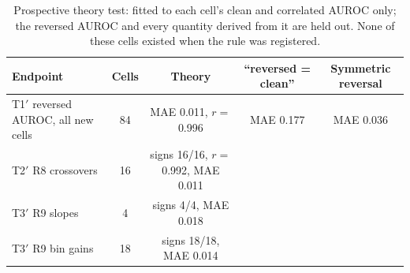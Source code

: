 \begin{table}[H]\centering\scriptsize
\caption{Prospective theory test: fitted to each cell's clean and correlated AUROC only; the reversed AUROC and every quantity derived from it are held out. None of these cells existed when the rule was registered.}\label{tab:r11}
\begin{tabular}{lcccc}\toprule
Endpoint & Cells & Theory & ``reversed = clean'' & Symmetric reversal \\\midrule
T1$'$ reversed AUROC, all new cells & 84 & MAE 0.011, $r=$ 0.996 & MAE 0.177 & MAE 0.036 \\
T2$'$ R8 crossovers & 16 & signs 16/16, $r=$ 0.992, MAE 0.011 &  &  \\
T3$'$ R9 slopes & 4 & signs 4/4, MAE 0.018 &  &  \\
T3$'$ R9 bin gains & 18 & signs 18/18, MAE 0.014 &  &  \\
\bottomrule\end{tabular}
\end{table}
